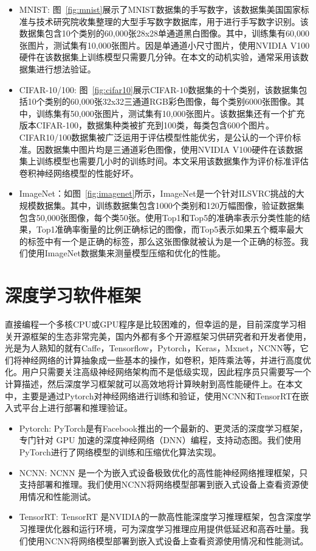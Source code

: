 \begin{itemize}
    \item MNIST: 图~\ref{fig:mnist}展示了MNIST数据集的手写数字，该数据集美国国家标准与技术研究院收集整理的大型手写数字数据库\cite{lecun1998mnist}，用于进行手写数字识别。该数据集包含10个类别的60,000张28x28单通道黑白图像。其中，训练集有60,000张图片，测试集有10,000张图片。因是单通道小尺寸图片，使用NVIDIA V100硬件在该数据集上训练模型只需要几分钟。在本文的动机实验，通常采用该数据集进行想法验证。
    \item CIFAR-10/100: 图~\ref{fig:cifar10}展示CIFAR-10\cite{2009learning}数据集的十个类别，该数据集包括10个类别的60,000张32x32三通道RGB彩色图像，每个类别6000张图像。其中，训练集有50,000张图片，测试集有10,000张图片。该数据集还有一个扩充版本CIFAR-100，数据集种类被扩充到100类，每类包含600个图片。CIFAR10/100数据集被广泛运用于评估模型性能优劣，是公认的一个评价标准。因数据集中图片均是三通道彩色图像，使用NVIDIA V100硬件在该数据集上训练模型也需要几小时的训练时间。本文采用该数据集作为评价标准评估卷积神经网络模型的性能好坏。
    \item ImageNet：如图~\ref{fig:imagenet}所示，ImageNet是一个针对ILSVRC挑战的大规模数据集\cite{krizhevsky2012imagenet}。其中，训练数据集包含1000个类别和120万幅图像，验证数据集包含50,000张图像，每个类50张。使用Top1和Top5的准确率表示分类性能的结果，Top1准确率衡量的比例正确标记的图像，而Top5表示如果五个概率最大的标签中有一个是正确的标签，那么这张图像就被认为是一个正确的标签。我们使用ImageNet数据集来测量模型压缩和优化的性能。
\end{itemize}

\section{深度学习软件框架}
直接编程一个多核CPU或GPU程序是比较困难的，但幸运的是，目前深度学习相关开源框架的生态非常完美，国内外都有多个开源框架习供研究者和开发者使用，光是为人熟知的就有Caffe，Tensorflow，Pytorch，Keras，Mxnet，NCNN等，它们将神经网络的计算抽象成一些基本的操作，如卷积，矩阵乘法等，并进行高度优化。用户只需要关注高级神经网络架构而不是低级实现，因此程序员只需要写一个计算描述，然后深度学习框架就可以高效地将计算映射到高性能硬件上。在本文中，主要是通过Pytorch对神经网络进行训练和验证，使用NCNN和TensorRT在嵌入式平台上进行部署和推理验证。

\begin{itemize}
    \item Pytorch: PyTorch\cite{pytorch}是有Facebook推出的一个最新的、更灵活的深度学习框架，专门针对 GPU 加速的深度神经网络（DNN）编程，支持动态图。我们使用PyTorch进行了网络模型的训练和压缩优化算法实现。
    \item NCNN: NCNN \cite{ncnn} 是一个为嵌入式设备极致优化的高性能神经网络推理框架，只支持部署和推理。我们使用NCNN将网络模型部署到嵌入式设备上查看资源使用情况和性能测试。
    \item TensorRT: TensorRT \cite{tensorrt} 是NVIDIA的一款高性能深度学习推理框架，包含深度学习推理优化器和运行环境，可为深度学习推理应用提供低延迟和高吞吐量。我们使用NCNN将网络模型部署到嵌入式设备上查看资源使用情况和性能测试。
\end{itemize}

